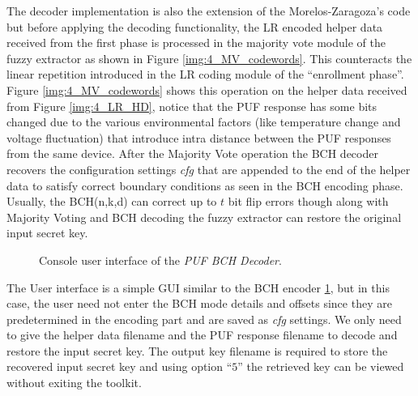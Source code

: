 	The decoder implementation is also the extension of the Morelos-Zaragoza's code \cite{69} but before applying the decoding functionality, the LR encoded helper data received from the first phase is processed in the majority vote module of the fuzzy extractor as shown in Figure \ref{img:4_MV_codewords}. This counteracts the linear repetition introduced in the LR coding module of the ``enrollment phase''. Figure \ref{img:4_MV_codewords} shows this operation on the helper data received from Figure \ref{img:4_LR_HD}, notice that the PUF
	response has some bits changed due to the various environmental factors (like temperature change and voltage fluctuation) that introduce intra distance between the PUF responses from the same device. After the Majority Vote operation the BCH decoder recovers the configuration settings \emph{cfg} that are appended to the end of the helper data to satisfy correct boundary conditions as seen in the BCH encoding phase. Usually, the BCH(n,k,d) can correct up to $t$ bit flip errors though along with Majority
	Voting and BCH decoding the fuzzy extractor can restore the original input secret key.\\

	\begin{figure}
	\centering
	\caption{Console user interface of the \emph{PUF BCH Decoder}.}
	\label{img:BCH_decoder_GUI}
	\end{figure}
	The User interface is a simple GUI similar to the BCH encoder \ref{img:BCH_decoder_GUI}, but in this case, the user need not enter the BCH mode details and offsets since they are predetermined in the encoding part and are saved as \emph{cfg} settings. We only need to give the helper data filename and the PUF response filename to decode and restore the input secret key. The output key filename is required to store the recovered input secret key and using option ``$5$'' the retrieved key can be viewed without
	exiting the toolkit.\\

